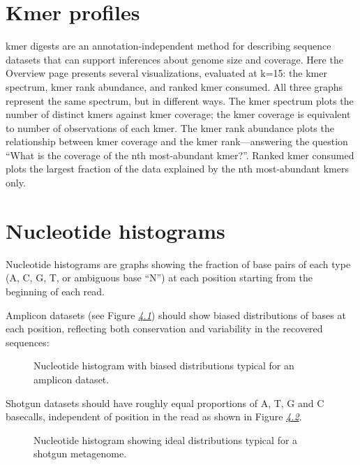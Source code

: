 \documentclass[letterpaper,10pt,english]{sphinxmanual}
\begin{document}
\section{Kmer profiles}
\label{\detokenize{user_manual:kmer-profiles}}
kmer digests are an annotation-independent method for describing
sequence datasets that can support inferences about genome size and
coverage. Here the Overview page presents several visualizations,
evaluated at k=15: the kmer spectrum, kmer rank abundance, and ranked
kmer consumed. All three graphs represent the same spectrum, but in
different ways. The kmer spectrum plots the number of distinct kmers
against kmer coverage; the kmer coverage is equivalent to number of
observations of each kmer. The kmer rank abundance plots the
relationship between kmer coverage and the kmer rank—answering the
question “What is the coverage of the nth most-abundant kmer?”. Ranked
kmer consumed plots the largest fraction of the data explained by the
nth most-abundant kmers only.


\section{Nucleotide histograms}
\label{\detokenize{user_manual:nucleotide-histograms}}
Nucleotide histograms are graphs showing the fraction of base pairs of
each type (A, C, G, T, or ambiguous base “N”) at each position starting
from the beginning of each read.

Amplicon datasets (see Figure {\hyperref[\detokenize{user_manual:fig:nucleotide-hist-amplicon}]{\emph{4.1}}})
should show biased distributions of bases at each position, reflecting
both conservation and variability in the recovered sequences:

\begin{figure}[htbp]
\centering
\capstart

\noindent{}
\caption{Nucleotide histogram with biased distributions typical for an
amplicon dataset.}\label{\detokenize{user_manual:fig-nucleotide-hist-amplicon}}\end{figure}

Shotgun datasets should have roughly equal proportions of A, T, G and C
basecalls, independent of position in the read as shown in Figure
{\hyperref[\detokenize{user_manual:fig:nucleotide-hist-ok}]{\emph{4.2}}}.

\begin{figure}[htbp]
\centering
\capstart

\noindent{}
\caption{Nucleotide histogram showing ideal distributions typical for a
shotgun metagenome.}\label{\detokenize{user_manual:fig-nucleotide-hist-ok}}\end{figure}
\end{document}
